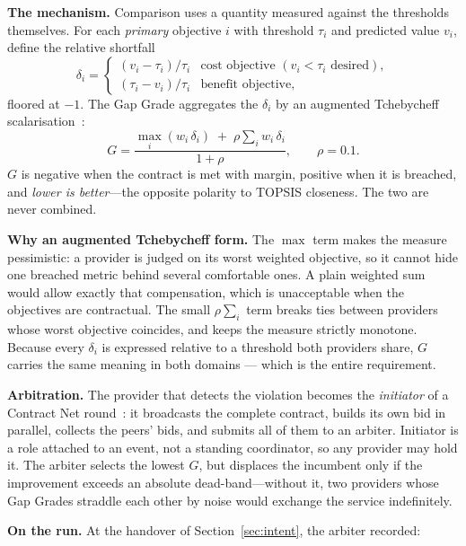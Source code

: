 \documentclass[conference]{IEEEtran}
\begin{document}
\textbf{The mechanism.} Comparison uses a quantity measured against the
thresholds themselves. For each \emph{primary} objective $i$ with threshold
$\tau_i$ and predicted value $v_i$, define the relative shortfall
\begin{equation}
\delta_i =
\begin{cases}
(v_i - \tau_i)/\tau_i & \text{cost objective } (v_i < \tau_i \text{ desired}),\\
(\tau_i - v_i)/\tau_i & \text{benefit objective},
\end{cases}
\label{eq:delta}
\end{equation}
floored at $-1$. The Gap Grade aggregates the $\delta_i$ by an augmented
Tchebycheff scalarisation~\cite{steuer1983}:
\begin{equation}
G = \frac{\max_i \left(w_i\,\delta_i\right) \;+\; \rho \sum_i w_i\,\delta_i}
         {1 + \rho}, \qquad \rho = 0.1 .
\label{eq:gapgrade}
\end{equation}
$G$ is negative when the contract is met with margin, positive when it is
breached, and \emph{lower is better}---the opposite polarity to TOPSIS
closeness. The two are never combined.

\textbf{Why an augmented Tchebycheff form.} The $\max$ term makes the measure
pessimistic: a provider is judged on its worst weighted objective, so it
cannot hide one breached metric behind several comfortable ones. A plain
weighted sum would allow exactly that compensation, which is unacceptable when
the objectives are contractual. The small $\rho \sum_i$ term breaks ties
between providers whose worst objective coincides, and keeps the measure
strictly monotone. Because every $\delta_i$ is expressed relative to a
threshold both providers share, $G$ carries the same meaning in both domains
--- which is the entire requirement.

\textbf{Arbitration.} The provider that detects the violation becomes the
\emph{initiator} of a Contract Net round~\cite{smith1980}: it broadcasts the
complete contract, builds its own bid in parallel, collects the peers' bids,
and submits all of them to an arbiter. Initiator is a role attached to an
event, not a standing coordinator, so any provider may hold it. The arbiter
selects the lowest $G$, but displaces the incumbent only if the improvement
exceeds an absolute dead-band---without it, two providers whose Gap Grades
straddle each other by noise would exchange the service indefinitely.

\textbf{On the run.} At the handover of Section~\ref{sec:intent}, the
arbiter recorded:
\end{document}
